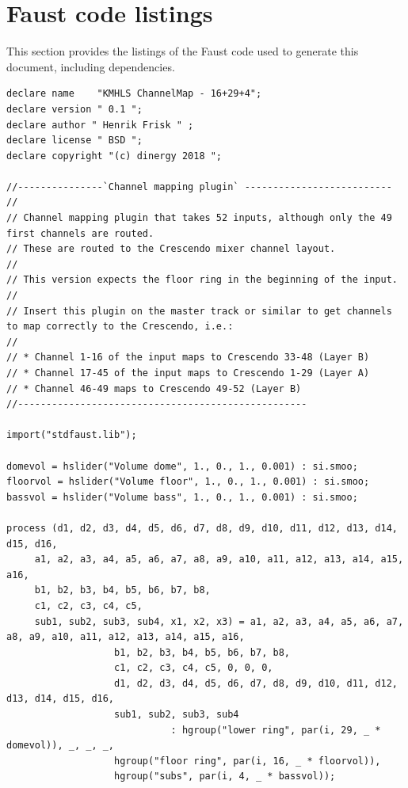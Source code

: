 \documentclass{article}
\begin{document}
 \section{Faust code listings} \label{listing}  This section provides the listings of the Faust code used to generate this document, including dependencies. 
\bigskip\bigskip
\begin{lstlisting}[caption=\texttt{KMHLS\_channel\_map\_lin.dsp}]
declare name	"KMHLS ChannelMap - 16+29+4";
declare version " 0.1 ";
declare author " Henrik Frisk " ;
declare license " BSD ";
declare copyright "(c) dinergy 2018 ";

//---------------`Channel mapping plugin` --------------------------
//
// Channel mapping plugin that takes 52 inputs, although only the 49 first channels are routed.
// These are routed to the Crescendo mixer channel layout.
//
// This version expects the floor ring in the beginning of the input.
// 
// Insert this plugin on the master track or similar to get channels to map correctly to the Crescendo, i.e.:
// 
// * Channel 1-16 of the input maps to Crescendo 33-48 (Layer B)
// * Channel 17-45 of the input maps to Crescendo 1-29 (Layer A)
// * Channel 46-49 maps to Crescendo 49-52 (Layer B)
//---------------------------------------------------

import("stdfaust.lib");

domevol = hslider("Volume dome", 1., 0., 1., 0.001) : si.smoo;
floorvol = hslider("Volume floor", 1., 0., 1., 0.001) : si.smoo;
bassvol = hslider("Volume bass", 1., 0., 1., 0.001) : si.smoo;

process (d1, d2, d3, d4, d5, d6, d7, d8, d9, d10, d11, d12, d13, d14, d15, d16,
	 a1, a2, a3, a4, a5, a6, a7, a8, a9, a10, a11, a12, a13, a14, a15, a16,
	 b1, b2, b3, b4, b5, b6, b7, b8,
	 c1, c2, c3, c4, c5, 
	 sub1, sub2, sub3, sub4, x1, x2, x3) = a1, a2, a3, a4, a5, a6, a7, a8, a9, a10, a11, a12, a13, a14, a15, a16,
				   b1, b2, b3, b4, b5, b6, b7, b8,
				   c1, c2, c3, c4, c5, 0, 0, 0,
				   d1, d2, d3, d4, d5, d6, d7, d8, d9, d10, d11, d12, d13, d14, d15, d16,
				   sub1, sub2, sub3, sub4
						     : hgroup("lower ring", par(i, 29, _ * domevol)), _, _, _,
				   hgroup("floor ring", par(i, 16, _ * floorvol)),
				   hgroup("subs", par(i, 4, _ * bassvol));
\end{lstlisting}
\end{document}

